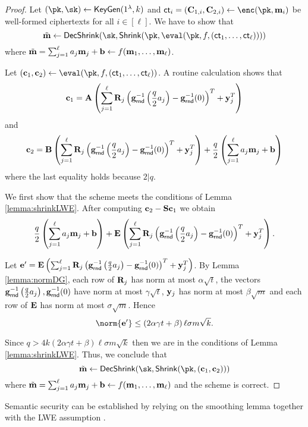 \begin{proof}
Let $(\pk,\sk)\leftarrow\keygen(1^\lambda,k)$ and  $\ct_i=(\Cn_{1,i},\Cn_{2,i})\leftarrow\enc(\pk,\mn_i)$ be well-formed ciphertexts for all $i\in[\ell]$. We have to show that $$\tilde \mn\leftarrow\mathsf{DecShrink}(\sk,\mathsf{Shrink}(\pk,\eval(\pk,f,(\ct_1,\dots, \ct_\ell))))$$ where $\tilde {\mathbf{m}}=\sum_{j=1}^\ell a_j\mathbf{m}_j + \mathbf{b}\leftarrow f(\mathbf{m}_1,\dots, \mathbf{m}_\ell)$.


Let $(\cn_1,\cn_2)\leftarrow\eval(\pk,f,(\ct_1,\dots, \ct_\ell))$. A routine calculation shows that $$\mathbf{c}_1=\mathbf{A}\left(\sum_{j=1}^\ell \mathbf{R}_j\left(\mathbf{g}^{-1}_{\mathsf{rnd}}\left(\frac{q}{2} a_j\right) - \mathbf{g}^{-1}_\mathsf{rnd}(0)\right)^T+\mathbf{y}_j^T\right)$$ and $$\mathbf{c}_2=\mathbf{B}\left(\sum_{j=1}^\ell \mathbf{R}_j\left(\mathbf{g}^{-1}_{\mathsf{rnd}}\left(\frac{q}{2} a_j\right) - \mathbf{g}^{-1}_\mathsf{rnd}(0)\right)^T+\mathbf{y}_j^T\right) + \frac{q}{2}\left(\sum_{j=1}^\ell a_j\mathbf{m}_j + \mathbf{b}\right)$$ where the last equality holds because $2|q$. 

We first show that the scheme meets the conditions of Lemma \ref{lemma:shrinkLWE}. After computing $\mathbf{c}_2-\mathbf{S}\mathbf{c}_1$ we obtain $$\frac{q}{2}\left(\sum_{j=1}^\ell a_j\mathbf{m}_j + \mathbf{b}\right) + \mathbf{E}\left(\sum_{j=1}^\ell \mathbf{R}_j\left(\mathbf{g}^{-1}_{\mathsf{rnd}}\left(\frac{q}{2} a_j\right) - \mathbf{g}^{-1}_\mathsf{rnd}(0)\right)^T+\mathbf{y}_j^T\right).$$


Let $\mathbf{e}'=\mathbf{E}\left(\sum_{j=1}^\ell \mathbf{R}_j\left(\mathbf{g}^{-1}_{\mathsf{rnd}}\left(\frac{q}{2} a_j\right) - \mathbf{g}^{-1}_\mathsf{rnd}(0)\right)^T+\mathbf{y}^T_j\right)$. By Lemma \ref{lemma:normDG}, each row of $\mathbf{R}_j$ has norm at most $\alpha\sqrt{t}$, the vectors $\mathbf{g}^{-1}_{\mathsf{rnd}}\left(\frac{q}{2} a_j\right),\mathbf{g}^{-1}_\mathsf{rnd}(0)$ have norm at most $\gamma\sqrt{t}$, $\mathbf{y}_j$ has norm at most $\beta\sqrt{m}$ and each row of $\mathbf{E}$ has norm at most $\sigma\sqrt{m}$. Hence $$\norm{\en'}\leq \left(2\alpha\gamma t  + \beta \right)\ell\sigma m\sqrt{k}.$$

Since $q>4k\left(2\alpha\gamma t  + \beta \right)\ell\sigma m\sqrt{k}$ then we are in the conditions of Lemma \ref{lemma:shrinkLWE}. Thus, we conclude that $$\tilde \mn\leftarrow\mathsf{DecShrink}(\sk,\mathsf{Shrink}(\pk,(\cn_1,\cn_2)))$$ where $\tilde {\mathbf{m}}=\sum_{j=1}^\ell a_j\mathbf{m}_j + \mathbf{b}\leftarrow f(\mathbf{m}_1,\dots, \mathbf{m}_\ell)$ and the scheme is correct.
\end{proof}



Semantic security can be established by relying on the smoothing lemma together with the  LWE assumption \cite{STOC:Regev05,FOCS:MicReg04}.

